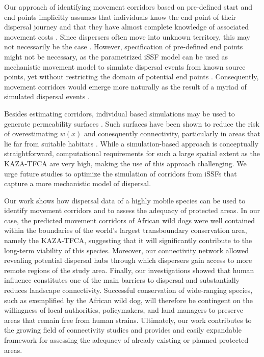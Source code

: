 \documentclass[abstract=on,10pt,a4paper,bibliography=totocnumbered]{article}
\begin{document}
Our approach of identifying movement corridors based on pre-defined start and
end points implicitly assumes that individuals know the end point of their
dispersal journey and that they have almost complete knowledge of associated
movement costs \citep{Panzacchi.2016}. Since dispersers often move into unknown
territory, this may not necessarily be the case \citep{Abrahms.2017,
Cozzi.2020}. However, specification of pre-defined end points might not be
necessary, as the parametrized iSSF model can be used as mechanistic movement
model to simulate dispersal events from known source points, yet without
restricting the domain of potential end points \citep{Signer.2017}.
Consequently, movement corridors would emerge more naturally as the result of a
myriad of simulated dispersal events \citep{Zeller.2020}.

Besides estimating corridors, individual based simulations may be used to
generate permeability surfaces \citep{Avgar.2016, Signer.2017}. Such surfaces
have been shown to reduce the risk of overestimating \(w(x)\) and conesquently
connectivity, particularly in areas that lie far from suitable habitats
\citep{Signer.2017}. While a simulation-based approach is conceptually
straightforward, computational requirements for such a large spatial extent as
the KAZA-TFCA are very high, making the use of this approach challenging. We
urge future studies to optimize the simulation of corridors from iSSFs that
capture a more mechanistic model of dispersal.

Our work shows how dispersal data of a highly mobile species can be used to
identify movement corridors and to assess the adequacy of protected areas. In
our case, the predicted movement corridors of African wild dogs were well
contained within the boundaries of the world's largest transboundary
conservation area, namely the KAZA-TFCA, suggesting that it will significantly
contribute to the long-term viability of this species. Moreover, our
connectivity network allowed revealing potential dispersal hubs through which
dispersers gain access to more remote regions of the study area. Finally, our
investigations showed that human influence constitutes one of the main barriers
to dispersal and substantially reduces landscape connectivity. Successful
conservation of wide-ranging species, such as exemplified by the African wild
dog, will therefore be contingent on the willingness of local authorities,
policymakers, and land managers to preserve areas that remain free from human
strains. Ultimately, our work contributes to the growing field of connectivity
studies and provides and easily expandable framework for assessing the adequacy
of already-existing or planned protected areas.
\end{document}
